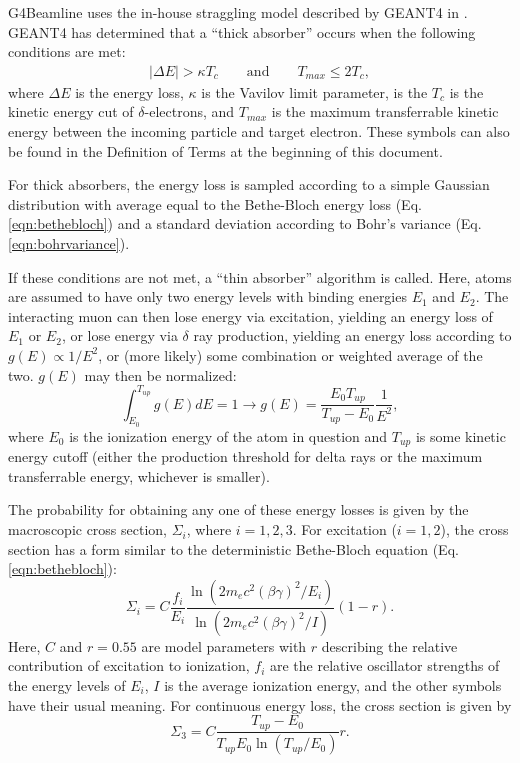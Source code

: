  \label{sec:g4blstraggling}

G4Beamline uses the in-house straggling model described by GEANT4 in \cite{geant4}.  GEANT4 has determined that a ``thick absorber'' occurs when the following conditions are met:
\begin{align}\label{eqn:G4StragglingThickTest}
|\Delta E| > \kappa T_c \qquad \text{and} \qquad T_{max} \le 2T_c,
\end{align}
where $\Delta E$ is the energy loss, $\kappa$ is the Vavilov limit parameter, is the $T_c$ is the kinetic energy cut of $\delta$-electrons, and $T_{max}$ is the maximum transferrable kinetic energy between the incoming particle and target electron. These symbols can also be found in the Definition of Terms at the beginning of this document.

For thick absorbers, the energy loss is sampled according to a simple Gaussian distribution with average equal to the Bethe-Bloch energy loss (Eq. \eqref{eqn:bethebloch}) and a standard deviation according to Bohr's variance (Eq. \eqref{eqn:bohrvariance}).

If these conditions are not met, a ``thin absorber'' algorithm is called. Here, atoms are assumed to have only two energy levels with binding energies $E_1$ and $E_2$. The interacting muon can then lose energy via excitation, yielding an energy loss of $E_1$ or $E_2$, or lose energy via $\delta$ ray production, yielding an energy loss according to $ g(E) \propto 1/E^2 $, or (more likely) some combination or weighted average of the two. $g(E)$ may then be normalized:
\begin{equation}
\int_{E_0}^{T_{up}} g(E) dE = 1 \rightarrow g(E)=\frac{E_0 T_{up}}{T_{up}-E_0}\frac{1}{E^2},
\label{eqn:G4StragglingIonization}
\end{equation}
where $E_0$ is the ionization energy of the atom in question and $T_{up}$ is some kinetic energy cutoff (either the production threshold for delta rays or the maximum transferrable energy, whichever is smaller).

The probability for obtaining any one of these energy losses is given by the macroscopic cross section, $\Sigma_i$, where $i=1,2,3$. For excitation ($i=1,2$), the cross section has a form similar to the deterministic Bethe-Bloch equation (Eq. \eqref{eqn:bethebloch}):
\begin{equation}\label{eqn:G4StragglingCrossSectionExcitation}
\Sigma_i=C\frac{f_i}{E_i}\frac{\ln(2m_e c^2(\beta\gamma)^2/E_i)}{\ln(2m_e c^2(\beta\gamma)^2/I)}(1-r).
\end{equation}
Here, $C$ and $r=0.55$ are model parameters with $r$ describing the relative contribution of excitation to ionization, $f_i$ are the relative oscillator strengths of the energy levels of $E_i$, $I$ is the average ionization energy, and the other symbols have their usual meaning. For continuous energy loss, the cross section is given by
\begin{equation}\label{eqn:G4StragglingCrossSectionIonization}
\Sigma_3=C\frac{T_{up}-E_0}{T_{up}E_0\ln(T_{up}/E_0)}r.
\end{equation}

